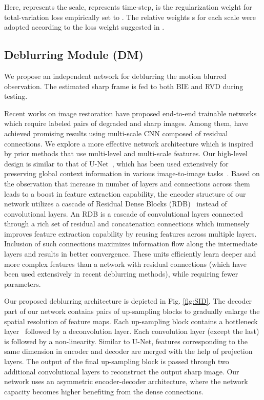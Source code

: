 \documentclass[10pt,twocolumn,letterpaper]{article}
\begin{document}
 

\noindent Here,  represents the scale,  represents time-step,  is the regularization weight for total-variation loss empirically set to . The relative weights s for each scale were adopted according to the loss weight suggested in \cite{mayer2016large}. 

\subsection{Deblurring Module (DM)}


We propose an independent network for deblurring the motion blurred observation. The estimated sharp frame is fed to both BIE and RVD during testing. 

  Recent works on image restoration have proposed end-to-end trainable networks which require labeled pairs of degraded and sharp images. Among them, \cite{nah2017deep,tao2018scale} have achieved promising results using multi-scale CNN composed of residual connections. We explore a more effective network architecture which is inspired by prior methods that use multi-level and multi-scale features. Our high-level design is similar to that of U-Net~\cite{ronneberger2015u}, which has been used extensively for preserving global context information in various image-to-image tasks~\cite{isola2017image}. Based on the observation that increase in number of layers and connections across them leads to a boost in feature extraction capability, the encoder structure of our network utilizes a cascade of Residual Dense Blocks (RDB)~\cite{zhang2018residual} instead of convolutional layers. An RDB is a cascade of convolutional layers connected through a rich set of residual and concatenation connections which immensely improves feature extraction capability by reusing features across multiple layers.  Inclusion of such connections maximizes information flow along the intermediate layers and results in better convergence. These units efficiently learn deeper and more complex features than a network with residual connections (which have been used extensively in recent deblurring methods\cite{nah2017deep,kupyn2017deblurgan,tao2018scale,jin2018learning}), while requiring fewer parameters.

Our proposed deblurring architecture is depicted in Fig. \ref{fig:SID}. The decoder part of our network contains  pairs of up-sampling blocks to gradually enlarge the spatial resolution of feature maps. Each up-sampling block contains a bottleneck layer~\cite{jegou2017one} followed by a deconvolution layer. Each convolution layer (except the last) is followed by a non-linearity. Similar to U-Net, features corresponding to the same dimension in encoder and decoder are merged with the help of projection layers. The output of the final up-sampling block is passed through two additional convolutional layers to reconstruct the output sharp image. Our network uses an asymmetric encoder-decoder architecture, where the network capacity becomes higher benefiting from the dense connections. 
\end{document}
